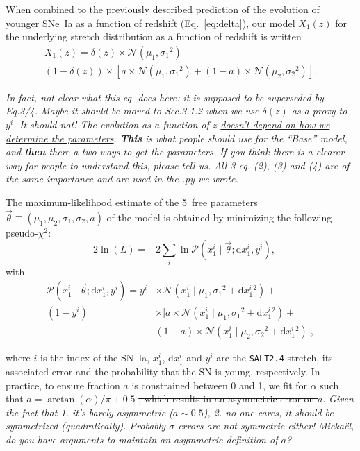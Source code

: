 \documentclass[]{aa} %
\newcommand{\nn}[1]{{\textcolor[rgb]{0.25, 0.50, 0}{#1}}}
\newcommand{\yc}[1]{{\textcolor{BrickRed}{#1}}}
\newcommand{\prob}[2]{\mathcal{P}\left( #1 \mid #2\right)}
\begin{document}
When combined to the previously described prediction of the evolution of younger
SNe~Ia as a function of redshift (Eq.~\ref{eq:delta}), our model $X_1(z)$ for
the underlying stretch distribution as a function of redshift is written
\begin{multline}\label{eq:stretchz}
    X_1(z) = \delta(z) \times \mathcal{N}(\mu_1,\sigma_1{}^2) + {} \\
    (1-\delta(z)) \times \left[ a\times\mathcal{N}(\mu_1,\sigma_1{}^2) +
    (1-a)\times\mathcal{N}(\mu_2,\sigma_2{}^2) \right].
\end{multline}

\yc{\textit{In fact, not clear what this eq. does here: it is supposed to be
superseded by Eq.3/4. Maybe it should be moved to Sec.3.1.2 when we use
$\delta(z)$ as a proxy to $y^i$.}} 
\nn{\textit{It should not! The evolution as a function of $z$ \underline{doesn't
depend on how we determine the parameters}. \textbf{This} is what people should
use for the ``Base'' model, and \textbf{then} there a two ways to get the
parameters. If you think there is a clearer way for people to understand this,
please tell us. All 3 eq. (2), (3) and (4) are of the same importance and are
used in the .py we wrote.}}

The maximum-likelihood estimate of the 5~free parameters
$\vec{\theta}\equiv({\mu_1,\mu_2,\sigma_1,\sigma_2,a})$ of the model is obtained
by minimizing the following pseudo-$\chi^2$:
\begin{equation}\label{eq:likelihood}
    -2\ln(L) = -2 \sum_i \ln \prob{x^{i}_{1}}{\vec{\theta};
    \mathrm{d}x^{i}_{1}, y^i},
\end{equation}
with
\begin{align}\label{eq:likelihoodsnf}
    \prob{x^i_1}{\vec{\theta}; \mathrm{d}x^i_1, y^i} =
    y^i & \times
    \mathcal{N}\left(x^i_1 \mid \mu_1, \sigma_1{}^2+\mathrm{d}x^i_1{}^2\right) +
    \nonumber\\
    (1-y^i) &\times \bigg[
    a \times \mathcal{N}\left(x^i_1 \mid \mu_1,
    \sigma_1{}^2+\mathrm{d}x^i_1{}^2\right) +
    \nonumber\\
    & (1-a) \times \mathcal{N}\left(x^i_1 \mid \mu_2,
    \sigma_2{}^{2}+\mathrm{d}x^i_1{}^2\right) \bigg],
\end{align}

where $i$ is the index of the SN~Ia, $x^i_1$, $\mathrm{d}x^i_1$ and $y^i$ are
the \textsc{\texttt{SALT2.4}} stretch, its associated error and the probability
that the SN is young, respectively. In practice, to ensure fraction $a$ is
constrained between 0 and 1, we fit for $\alpha$ such that
$a=\arctan(\alpha)/\pi+0.5$ \yc{\sout{, which results in an asymmetric error on
$a$}}. \yc{\textit{Given the fact that 1. it's barely asymmetric ($a\sim 0.5$),
2. no one cares, it should be symmetrized (quadratically). Probably $\sigma$
errors are not symmetric either!}} \nn{\textit{Mickaël, do you have arguments to
maintain an asymmetric definition of $a$?}}
\end{document}
